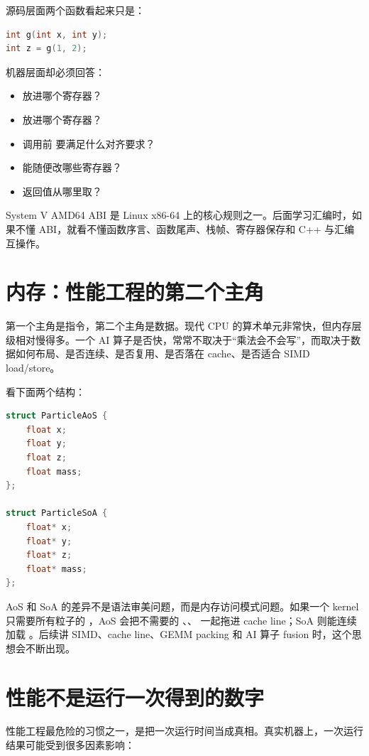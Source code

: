 源码层面两个函数看起来只是：

\begin{lstlisting}[language=C++]
int g(int x, int y);
int z = g(1, 2);
\end{lstlisting}

机器层面却必须回答：

\begin{itemize}
  \item {} 放进哪个寄存器？
  \item {} 放进哪个寄存器？
  \item 调用前  要满足什么对齐要求？
  \item {} 能随便改哪些寄存器？
  \item 返回值从哪里取？
\end{itemize}

System V AMD64 ABI 是 Linux x86-64 上的核心规则之一。后面学习汇编时，如果不懂 ABI，就看不懂函数序言、函数尾声、栈帧、寄存器保存和 C++ 与汇编互操作。

\section{内存：性能工程的第二个主角}

第一个主角是指令，第二个主角是数据。现代 CPU 的算术单元非常快，但内存层级相对慢得多。一个 AI 算子是否快，常常不取决于“乘法会不会写”，而取决于数据如何布局、是否连续、是否复用、是否落在 cache、是否适合 SIMD load/store。

看下面两个结构：

\begin{lstlisting}[language=C++]
struct ParticleAoS {
    float x;
    float y;
    float z;
    float mass;
};

struct ParticleSoA {
    float* x;
    float* y;
    float* z;
    float* mass;
};
\end{lstlisting}

AoS 和 SoA 的差异不是语法审美问题，而是内存访问模式问题。如果一个 kernel 只需要所有粒子的 ，AoS 会把不需要的 、、 一起拖进 cache line；SoA 则能连续加载 。后续讲 SIMD、cache line、GEMM packing 和 AI 算子 fusion 时，这个思想会不断出现。

\section{性能不是运行一次得到的数字}

性能工程最危险的习惯之一，是把一次运行时间当成真相。真实机器上，一次运行结果可能受到很多因素影响：

